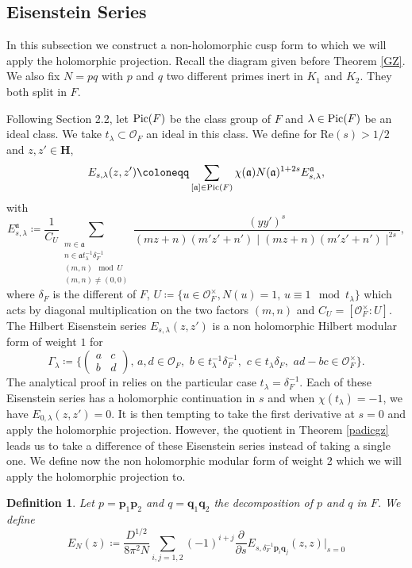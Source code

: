 \documentclass[a4paper,12pt]{article}
\newtheorem{definition}[theorem]{Definition}
\begin{document}
\subsection{Eisenstein Series}
In this subsection we construct a non-holomorphic cusp form to which we will apply the holomorphic projection.
Recall the diagram given before Theorem \ref{GZ}. We also fix $N=pq$ with $p$ and $q$ two different primes inert in $K_1$ and $K_2$. They both split in $F$.
\par
 Following \cite{DDP} Section 2.2, let $\textup{Pic}(F)$ be the class group of $F$ and $\lambda\in \textup{Pic}(F)$ be an ideal class. We take $t_\lambda\subset \mathcal{O}_F$ an ideal in this class. We define for $\text{Re}(s)>1/2$ and $z,z'\in\mathbf{H}$,
\[E_{s,\lambda}(z,z')\coloneqq \sum_{[\mathfrak{a}]\in \textup{Pic}(F)}\chi(\mathfrak{a})N(\mathfrak{a})^{1+2s} E_{s,\lambda}^\mathfrak{a}, \]
with 
\[ E_{s,\lambda}^\mathfrak{a}\coloneqq \frac{1}{C_U}\sum_{\substack{m\in \mathfrak{a} \\ n\in \mathfrak{a} t_\lambda^{-1} \delta_F^{-1} \\ (m,n) \mod U \\ (m,n)\neq (0,0)}} \frac{(yy')^{s}}{(mz+n)(m'z'+n') \mid (mz+n)(m'z'+n')\mid^{2s}},\]
where $\delta_F$ is the different of $F$, $U\coloneqq \{ u\in \mathcal{O}_F^\times, N(u)=1,\, u \equiv 1 \mod t_\lambda \}$ which acts by diagonal multiplication on the two factors $(m,n)$ and $C_U=[\mathcal{O}_F^\times:U]$. The Hilbert Eisenstein series $E_{s,\lambda}(z,z')$ is a non holomorphic Hilbert modular form of weight $1$ for 
\[\Gamma_\lambda\coloneqq \biggl\{\begin{pmatrix} a & c\\ b& d\end{pmatrix}, \, a,d\in \mathcal{O}_F,\,\, b\in t_\lambda^{-1}\delta_F ^{-1},\,\, c\in t_\lambda \delta_F, \,\, ad-bc\in \mathcal{O}_F^\times \biggl\}.\]
The analytical proof in \cite{GrossZagier84} relies on the particular case $t_\lambda=\delta_F^{-1}$.
Each of these Eisenstein series has a holomorphic continuation in $s$ and when $\chi(t_\lambda)=-1$, we have $E_{0,\lambda}(z,z')=0$. It is then tempting to take the first derivative at $s=0$ and apply the holomorphic projection. However, the quotient in Theorem \ref{padicgz} leads us to take a difference of these Eisenstein series instead of taking a single one. We define now the non holomorphic modular form of weight 2 which we will apply the holomorphic projection to. 
\begin{definition}\label{def Eis}
    Let $p=\mathbf{p}_1\mathbf{p}_2$ and $q=\mathbf{q}_1\mathbf{q}_2$ the decomposition of $p$ and $q$ in $F$. We define 
\begin{equation}
 E_N(z)\coloneqq  \frac{D^{1/2}}{8\pi^2N}\sum_{i,j=1,2}(-1)^{i+j}\frac{\partial}{\partial s}E_{s,\delta_F^{-1}\mathbf{p}_i\mathbf{q}_j}(z,z)\biggl|_{s=0}
\end{equation}
\end{definition}
\end{document}
